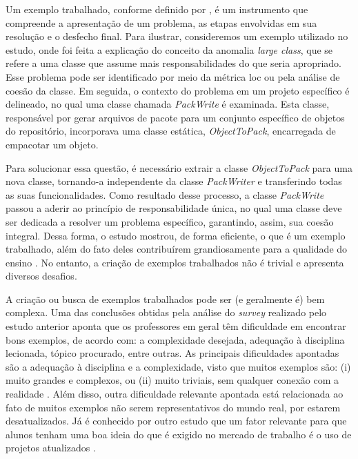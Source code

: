 Um exemplo trabalhado, conforme definido por , é um instrumento que compreende a apresentação de um problema, as etapas envolvidas em sua resolução e o desfecho final. Para ilustrar, consideremos um exemplo utilizado no estudo, onde foi feita a explicação do conceito da anomalia \textit{large class}, que se refere a uma classe que assume mais responsabilidades do que seria apropriado. Esse problema pode ser identificado por meio da métrica \gls{loc} ou pela análise de coesão da classe. Em seguida, o contexto do problema em um projeto específico é delineado, no qual uma classe chamada \textit{PackWrite} é examinada. Esta classe, responsável por gerar arquivos de pacote para um conjunto específico de objetos do repositório, incorporava uma classe estática, \textit{ObjectToPack}, encarregada de empacotar um objeto.

Para solucionar essa questão, é necessário extrair a classe \textit{ObjectToPack} para uma nova classe, tornando-a independente da classe \textit{PackWriter} e transferindo todas as suas funcionalidades. Como resultado desse processo, a classe \textit{PackWrite} passou a aderir ao princípio de responsabilidade única, no qual uma classe deve ser dedicada a resolver um problema específico, garantindo, assim, sua coesão integral. Dessa forma, o estudo mostrou, de forma eficiente, o que é um exemplo trabalhado, além do fato deles contribuírem grandiosamente para a qualidade do ensino \cite{Simone.Tonhao-etal:2021}. No entanto, a criação de exemplos trabalhados não é trivial e apresenta diversos desafios.

A criação ou busca de exemplos trabalhados pode ser (e geralmente é) bem complexa. Uma das conclusões obtidas pela análise do \textit{survey} realizado pelo estudo anterior aponta que os professores em geral têm dificuldade em encontrar bons exemplos, de acordo com: a complexidade desejada, adequação à disciplina lecionada, tópico procurado, entre outras. As principais dificuldades apontadas são a adequação à disciplina e a complexidade, visto que muitos exemplos são: (i) muito grandes e complexos, ou (ii) muito triviais, sem qualquer conexão com a realidade \cite{Simone.Tonhao-etal:2021}. Além disso, outra dificuldade relevante apontada está relacionada ao fato de muitos exemplos não serem representativos do mundo real, por estarem desatualizados. Já é conhecido por outro estudo que um fator relevante para que alunos tenham uma boa ideia do que é exigido no mercado de trabalho é o uso de projetos atualizados \cite{OSSProjects-TheProfessors'Perspective}.

